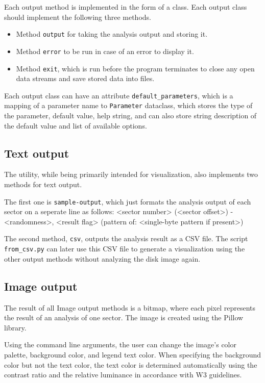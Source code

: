 \documentclass[
  digital, %
  color,   %
  oneside, %
  lof,     %
  nolot,     %
]{fithesis4}
\begin{document}
Each output method is implemented in the form of a class.
Each output class should implement the following three methods.
\begin{itemize}
    \item Method \texttt{output} for taking the analysis output and storing it.
    \item Method \texttt{error} to be run in case of an error to display it.
    \item Method \texttt{exit}, which is run before the program terminates to close any open data streams and save stored data into files.
\end{itemize}
Each output class can have an attribute \texttt{default\_parameters}, which is a mapping of a parameter name to \texttt{Parameter} dataclass, which stores the type of the parameter, default value, help string, and can also store string description of the default value and list of available options.

\subsection{Text output}
\label{ssec:text-output}

The utility, while being primarily intended for visualization, also implements two methods for text output.

The first one is \texttt{sample-output}, which just formats the analysis output of each sector on a seperate line as follows: <sector number> (<sector offset>) - <randomness>, <result flag> (pattern of: <single-byte pattern if present>)

The second method, \texttt{csv}, outputs the analysis result as a CSV file.
The script \texttt{from\_csv.py} can later use this CSV file to generate a visualization using the other output methods without analyzing the disk image again.

\subsection{Image output}
\label{ssec:image-output}

The result of all Image output methods is a bitmap, where each pixel represents the result of an analysis of one sector.
The image is created using the Pillow library.

Using the command line arguments, the user can change the image's color palette, background color, and legend text color.
When specifying the background color but not the text color, the text color is determined automatically using the contrast ratio and the relative luminance in accordance with W3 guidelines.\cite{w3guidelines}
\end{document}
